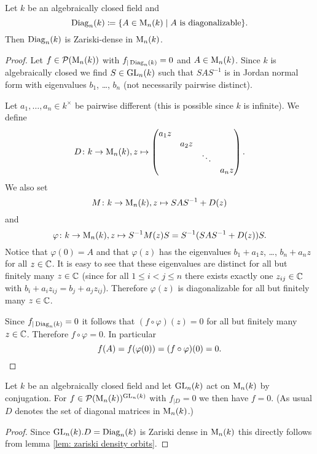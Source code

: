 \begin{prop}
  Let $k$ be an algebraically closed field and
  \[
              \operatorname{Diag}_n(k)
    \coloneqq \{
                A \in \operatorname{M}_n(k)
              \mid
                \text{$A$ is diagonalizable}
              \}.
  \]
  Then $\operatorname{Diag}_n(k)$ is Zariski-dense in $\operatorname{M}_n(k)$.
\end{prop}
\begin{proof}
  Let $f \in \mathcal{P}(\operatorname{M}_n(k))$ with $f_{|\operatorname{Diag}_n(k)} = 0$ and $A \in \operatorname{M}_n(k)$.
  Since $k$ is algebraically closed we find $S \in \operatorname{GL}_n(k)$ such that $SAS^{-1}$ is in Jordan normal form with eigenvalues $b_1$, \dots, $b_n$ (not necessarily pairwise distinct).
  
  Let $a_1, \dotsc, a_n \in k^\times$ be pairwise different (this is possible since $k$ is infinite).
  We define
  \[
            D
    \colon  k
    \to     \operatorname{M}_n(k), 
            z
    \mapsto \begin{pmatrix}
              a_1 z &       &        &       \\
                    & a_2 z &        &       \\
                    &       & \ddots &       \\
                    &       &        & a_n z
            \end{pmatrix}.
  \]
  We also set
  \[
            M
    \colon  k
    \to     \operatorname{M}_n(k),
            z
    \mapsto SAS^{-1} + D(z)
  \]
  and
  \[
            \varphi
    \colon  k
    \to     \operatorname{M}_n(k),
            z
    \mapsto S^{-1} M(z) S
    =       S^{-1}(SAS^{-1}+D(z))S.
  \]
  Notice that $\varphi(0) = A$ and that $\varphi(z)$ has the eigenvalues $b_1 + a_1 z$, \dots, $b_n + a_n z$ for all $z \in \mathbb{C}$.
  It is easy to see that these eigenvalues are distinct for all but finitely many $z \in \mathbb{C}$ (since for all $1 \leq i < j \leq n$ there exists exactly one $z_{ij} \in \mathbb{C}$ with $b_i + a_i z_{ij} = b_j + a_j z_{ij}$).
  Therefore $\varphi(z)$ is diagonalizable for all but finitely many $z \in \mathbb{C}$.
  
  Since $f_{|\operatorname{Diag}_n(k)} = 0$ it follows that $(f \circ \varphi)(z) = 0$ for all but finitely many $z \in \mathbb{C}$.
  Therefore $f \circ \varphi = 0$.
  In particular
  \[
      f(A)
    = f(\varphi(0))
    = (f \circ \varphi)(0)
    = 0.
    \qedhere
  \]
\end{proof}


\begin{cor}\label{cor: diagonal matrices dense alg closed}
  Let $k$ be an algebraically closed field and let $\operatorname{GL}_n(k)$ act on $\operatorname{M}_n(k)$ by conjugation.
  For $f \in \mathcal{P}(\operatorname{M}_n(k))^{\operatorname{GL}_n(k)}$ with $f_{|D} = 0$ we then have $f = 0$.
  (As usual $D$ denotes the set of diagonal matrices in $\operatorname{M}_n(k)$.)
\end{cor}
\begin{proof}
  Since $\operatorname{GL}_n(k).D = \operatorname{Diag}_n(k)$ is Zariski dense in $\operatorname{M}_n(k)$ this directly follows from lemma \ref{lem: zariski density orbits}.
\end{proof}


